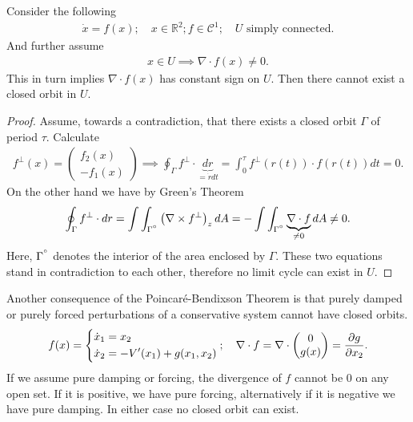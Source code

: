 \begin{proposition}
	Consider the following
	\begin{align}
		\dot{x}	= f(x);\quad x\in \mathbb{R}^{2}; f\in \mathcal{C}^{1};\quad U  \textrm{ simply connected} .
	\end{align}
And further assume 
 \begin{align}
	  x\in U \implies  \nabla \cdot  f(x) \neq 0.
\end{align}
This in turn implies $\nabla \cdot f(x)$ has constant sign on $U$. Then there cannot exist a closed orbit in $U$.
\end{proposition}
\begin{proof}
	Assume, towards a contradiction, that there exists a closed orbit $\Gamma$ of period $\tau$. Calculate 
	\begin{align}
	f^{\perp}(x) =
	\begin{pmatrix}
		f_2(x) \\ -f_1(x)
	\end{pmatrix}
	\implies \oint_{\Gamma }f^{\perp}\cdot \underbrace{dr}_{=\dot{r}dt}
	=\int_{0}^{\tau} f^{\perp}(r(t)) \cdot f(r(t)) dt = 0.
	\end{align}
On the other hand we have by Green's Theorem
\begin{align}
	\oint_{\Gamma }f^{\perp}\cdot dr = \int \int_{\Gamma^{\degree}} \left(\nabla \times f^{\perp}\right)_{z}dA = - \int \int_{\Gamma^{\degree}} \underbrace{\nabla \cdot f}_{\neq 0}dA \neq 0.
\end{align}
Here, $\Gamma^{\degree}$ denotes the interior of the area enclosed by $\Gamma$. These two equations stand in contradiction to each other, therefore no limit cycle can exist in $U$. 
\end{proof}
\begin{remark}[]
	Another consequence of the Poincaré-Bendixson Theorem is that purely damped or purely forced perturbations of a conservative system cannot have closed orbits. 
	\begin{align}
		f(x) =
		\begin{dcases}
			\dot{x}_1 = x_2 \\
			\dot{x}_2 = -V'(x_1) + g(x_1, x_2)
		\end{dcases}
		;\quad 
		\nabla \cdot f = \nabla \cdot
		\begin{pmatrix}
			0 \\ g(x)
		\end{pmatrix}
		=\frac{\partial g}{\partial x_2}.
	\end{align}
	If we assume pure damping or forcing, the divergence of $f$ cannot be 0 on any open set. If it is positive, we have pure forcing, alternatively if it is negative we have pure damping. In either case no closed orbit can exist.	
\end{remark}

